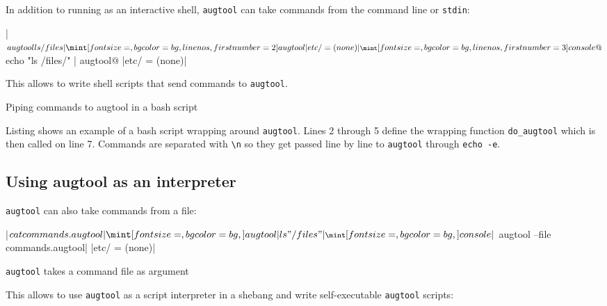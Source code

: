 In addition to running as an interactive shell, \verb!augtool! can take commands from the command line or \verb!stdin!:

 

\consolecode[linenos]|$ augtool ls /files|
\augtoolcode[linenos,firstnumber=2]|etc/ = (none)|
\consolecode[linenos,firstnumber=3]@$ echo "ls /files/" | augtool@
\augtoolcode[linenos,firstnumber=4]|etc/ = (none)|

This allows to write shell scripts that send commands to \verb!augtool!.

  

\begin{listing}
  \caption{Piping commands to augtool in a bash script}
  \label{lst:augtool_wrap}
\end{listing}


\begin{quote}
\end{quote}

Listing  shows an example of a bash script wrapping around \verb!augtool!. Lines 2 through 5 define the wrapping function \verb!do_augtool! which is then called on line 7. Commands are separated with \verb!\n! so they get passed line by line to \verb!augtool! through \verb!echo -e!.


\subsection{Using augtool as an interpreter}

\verb!augtool! can also take commands from a file:

 

\begin{listing}
  \consolecode|$ cat commands.augtool|
  \augtoolcode|ls "/files"|
  \consolecode|$ augtool --file commands.augtool|
  \augtoolcode|etc/ = (none)|
  \caption{\texttt{augtool} takes a command file as argument}
  \label{lst:augtool_file_arg}
\end{listing}

This allows to use \verb!augtool! as a script interpreter in a shebang and write self-executable \verb!augtool! scripts:


